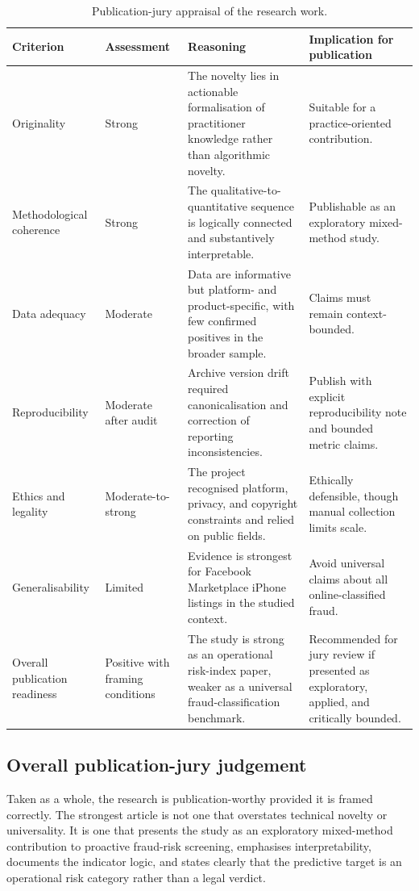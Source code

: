 \documentclass[11pt,a4paper]{article}
\begin{document}
\begin{table}[H]
\centering
\caption{Publication-jury appraisal of the research work.}
\begin{tabularx}{\textwidth}{p{3.0cm} p{2.2cm} Y Y}
\toprule
\textbf{Criterion} & \textbf{Assessment} & \textbf{Reasoning} & \textbf{Implication for publication} \\
\midrule
Originality & Strong & The novelty lies in actionable formalisation of practitioner knowledge rather than algorithmic novelty. & Suitable for a practice-oriented contribution. \\
Methodological coherence & Strong & The qualitative-to-quantitative sequence is logically connected and substantively interpretable. & Publishable as an exploratory mixed-method study. \\
Data adequacy & Moderate & Data are informative but platform- and product-specific, with few confirmed positives in the broader sample. & Claims must remain context-bounded. \\
Reproducibility & Moderate after audit & Archive version drift required canonicalisation and correction of reporting inconsistencies. & Publish with explicit reproducibility note and bounded metric claims. \\
Ethics and legality & Moderate-to-strong & The project recognised platform, privacy, and copyright constraints and relied on public fields. & Ethically defensible, though manual collection limits scale. \\
Generalisability & Limited & Evidence is strongest for Facebook Marketplace iPhone listings in the studied context. & Avoid universal claims about all online-classified fraud. \\
Overall publication readiness & Positive with framing conditions & The study is strong as an operational risk-index paper, weaker as a universal fraud-classification benchmark. & Recommended for jury review if presented as exploratory, applied, and critically bounded. \\
\bottomrule
\end{tabularx}
\end{table}

\subsection{Overall publication-jury judgement}
Taken as a whole, the research is publication-worthy provided it is framed correctly. The strongest article is not one that overstates technical novelty or universality. It is one that presents the study as an exploratory mixed-method contribution to proactive fraud-risk screening, emphasises interpretability, documents the indicator logic, and states clearly that the predictive target is an operational risk category rather than a legal verdict.
\end{document}
